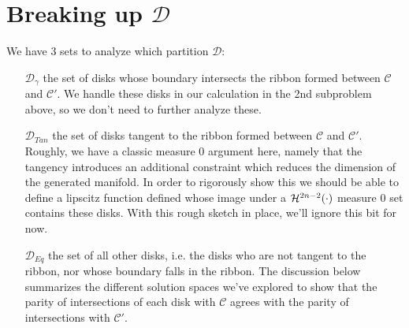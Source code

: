 \documentclass{article}
\newcommand{\haus}[2]{\mathcal{H}^{#1}\parens{#2}}
\begin{document}
\section{Breaking up $\mathcal{D}$}%
We have 3 sets to analyze which partition $\mathcal{D}$:
\begin{itemize}
  \item[$\mathcal{D}_{\gamma}$] the set of disks whose boundary intersects the ribbon formed between $\mathcal{C}$ and $\mathcal{C}'$. We handle these disks in our calculation in the 2nd subproblem above, so we don't need to further analyze these.

  \item[$\mathcal{D}_{Tan}$] the set of disks tangent to the ribbon formed between $\mathcal{C}$ and $\mathcal{C}'$. Roughly, we have a classic measure $0$ argument here, namely that the tangency introduces an additional constraint which reduces the dimension of the generated manifold. In order to rigorously show this we should be able to define a lipscitz function defined whose image under a $\haus{2n-2}{\cdot}$ measure $0$ set contains these disks. With this rough sketch in place, we'll ignore this bit for now.

  \item[$\mathcal{D}_{Eq}$] the set of all other disks, i.e. the disks who are not tangent to the ribbon, nor whose boundary falls in the ribbon. The discussion below summarizes the different solution spaces we've explored to show that the parity of intersections of each disk with $\mathcal{C}$ agrees with the parity of intersections with $\mathcal{C}'$.
\end{itemize}
\end{document}
